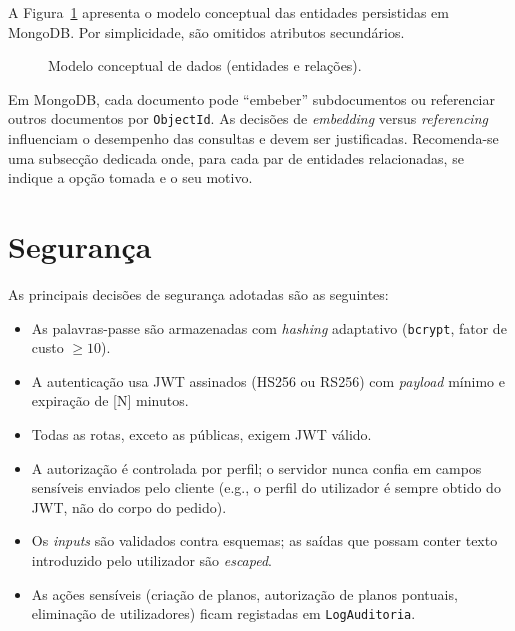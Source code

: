 
A Figura~\ref{fig:modelo-dados} apresenta o modelo conceptual
das entidades persistidas em MongoDB. Por simplicidade, são
omitidos atributos secundários.

\begin{figure}[H]
\centering
{}
\caption{Modelo conceptual de dados (entidades e relações).}
\label{fig:modelo-dados}
\end{figure}

\begin{nota}
Em MongoDB, cada documento pode ``embeber'' subdocumentos ou
referenciar outros documentos por \texttt{ObjectId}. As decisões
de \emph{embedding} versus \emph{referencing} influenciam o
desempenho das consultas e devem ser justificadas. Recomenda-se
uma subsecção dedicada onde, para cada par de entidades
relacionadas, se indique a opção tomada e o seu motivo.
\end{nota}


\section{Segurança}
\label{sec:seguranca}


As principais decisões de segurança adotadas são as seguintes:

\begin{itemize}
  \item As palavras-passe são armazenadas com \emph{hashing} adaptativo (\texttt{bcrypt}, fator de custo $\geq 10$).
  \item A autenticação usa JWT assinados (HS256 ou RS256) com \emph{payload} mínimo e expiração de [N] minutos.
  \item Todas as rotas, exceto as públicas, exigem JWT válido.
  \item A autorização é controlada por perfil; o servidor nunca confia em campos sensíveis enviados pelo cliente (e.g., o perfil do utilizador é sempre obtido do JWT, não do corpo do pedido).
  \item Os \emph{inputs} são validados contra esquemas; as saídas que possam conter texto introduzido pelo utilizador são \emph{escaped}.
  \item As ações sensíveis (criação de planos, autorização de planos pontuais, eliminação de utilizadores) ficam registadas em \texttt{LogAuditoria}.
\end{itemize}


